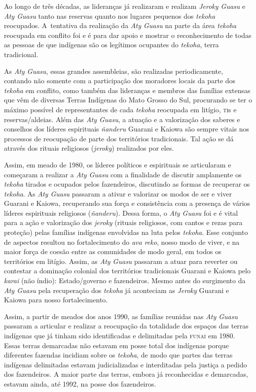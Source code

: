 Ao longo de três décadas, as lideranças já realizaram e realizam \emph{Jeroky
Guasu} e \emph{Aty Guasu} tanto nas reservas quanto nos lugares pequenos dos
\emph{tekoha} reocupados. A~tentativa da realização da \emph{Aty Guasu} na parte da
área \emph{tekoha} reocupada em conflito foi e é para dar apoio e mostrar o
reconhecimento de todas as pessoas de que indígenas são os legítimos
ocupantes do \emph{tekoha}, terra tradicional. 

As \emph{Aty Guasu}, essas grandes assembleias, são realizadas periodicamente,
contando não somente com a participação dos moradores locais da parte
dos \emph{tekoha} em conflito, como também das lideranças e membros das
famílias extensas que vêm de diversas Terras Indígenas do Mato Grosso
do Sul, procurando se ter o máximo possível de representantes de cada
\emph{tekoha} reocupada em litígio, \textsc{ti}s e reservas/aldeias. Além das \emph{Aty
Guasu}, a atuação e a valorização dos saberes e conselhos dos líderes
espirituais \emph{ñanderu} Guarani e Kaiowa são sempre vitais nos processos de
reocupação de parte dos territórios tradicionais. Tal ação se dá
através dos rituais religiosos (\emph{jeroky}) realizados por eles.

Assim, em meado de 1980, os líderes políticos e espirituais se
articularam e começaram a realizar a \emph{Aty Guasu} com a finalidade de
discutir amplamente os \emph{tekoha} tirados e ocupados pelos fazendeiros,
discutindo as formas de recuperar os \emph{tekoha}. As \emph{Aty Guasu} passaram a
ativar e valorizar os modos de ser e viver Guarani e Kaiowa,
recuperando sua força e consistência com a presença de vários líderes
espirituais religiosos (\emph{ñanderu}). Dessa forma, o \emph{Aty Guasu} foi e é
vital para a ação e valorização dos \emph{jeroky} (rituais religiosos, com
cantos e rezas para proteção) pelas famílias indígenas envolvidas na
luta pelos \emph{tekoha}. Esse conjunto de aspectos resultou no fortalecimento
do \emph{ava reko}, nosso modo de viver, e na maior força de coesão entre as
comunidades de modo geral, em todos os territórios em litígio. Assim,
as \emph{Aty Guasu} passaram a atuar para reverter ou contestar a dominação
colonial dos territórios tradicionais Guarani e Kaiowa pelo \emph{karai} (não
índio): Estado/governo e fazendeiros. Mesmo antes do surgimento da \emph{Aty
Guasu} pela recuperação dos \emph{tekoha} já aconteciam as \emph{Jeroky} Guarani e
Kaiowa para nosso fortalecimento.

Assim, a partir de meados dos anos 1990, as famílias reunidas nas \emph{Aty
Guasu} passaram a articular e realizar a reocupação da totalidade dos
espaços das terras indígenas que já tinham sido identificadas e
delimitadas pela \textsc{funai} em 1980. Essas terras demarcadas não estavam em
posse total dos indígenas porque diferentes fazendas incidiam sobre os
\emph{tekoha}, de modo que partes das terras indígenas delimitadas estavam
judicializadas e interditadas pela justiça a pedido dos fazendeiros. A
maior parte das terras, embora já reconhecidas e demarcadas, estavam
ainda, até 1992, na posse dos fazendeiros. 

